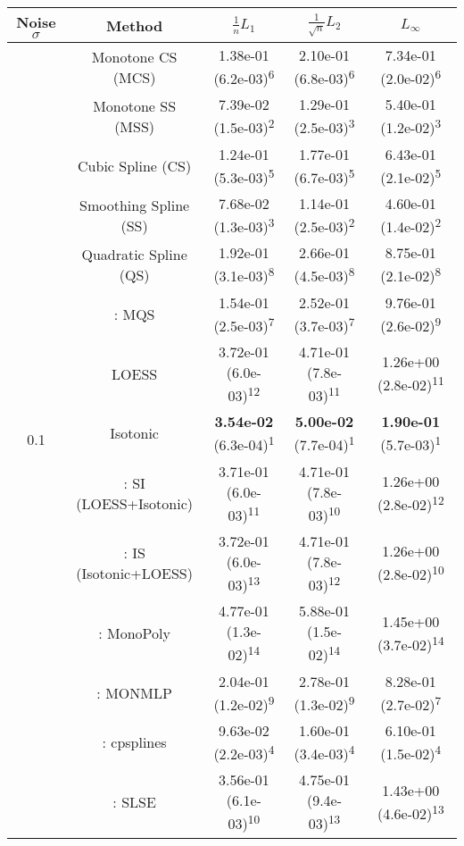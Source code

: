 \begin{tabular}{ccccc}
\toprule
Noise $\sigma$ & Method&$\frac 1n L_1$&$\frac{1}{\sqrt n}L_2$&$L_\infty$\tabularnewline
\midrule
\multirow{14}{*}{0.1}&Monotone CS (MCS)& 1.38e-01 (6.2e-03)\textsuperscript{6}& 2.10e-01 (6.8e-03)\textsuperscript{6}& 7.34e-01 (2.0e-02)\textsuperscript{6}\tabularnewline
&Monotone SS (MSS)& 7.39e-02 (1.5e-03)\textsuperscript{2}& 1.29e-01 (2.5e-03)\textsuperscript{3}& 5.40e-01 (1.2e-02)\textsuperscript{3}\tabularnewline
&Cubic Spline (CS)& 1.24e-01 (5.3e-03)\textsuperscript{5}& 1.77e-01 (6.7e-03)\textsuperscript{5}& 6.43e-01 (2.1e-02)\textsuperscript{5}\tabularnewline
&Smoothing Spline (SS)& 7.68e-02 (1.3e-03)\textsuperscript{3}& 1.14e-01 (2.5e-03)\textsuperscript{2}& 4.60e-01 (1.4e-02)\textsuperscript{2}\tabularnewline
&Quadratic Spline (QS)& 1.92e-01 (3.1e-03)\textsuperscript{8}& 2.66e-01 (4.5e-03)\textsuperscript{8}& 8.75e-01 (2.1e-02)\textsuperscript{8}\tabularnewline
&\textcite{heMonotoneBsplineSmoothing1998}: MQS& 1.54e-01 (2.5e-03)\textsuperscript{7}& 2.52e-01 (3.7e-03)\textsuperscript{7}& 9.76e-01 (2.6e-02)\textsuperscript{9}\tabularnewline
&LOESS& 3.72e-01 (6.0e-03)\textsuperscript{12}& 4.71e-01 (7.8e-03)\textsuperscript{11}& 1.26e+00 (2.8e-02)\textsuperscript{11}\tabularnewline
&Isotonic& \textbf{3.54e-02} (6.3e-04)\textsuperscript{1}& \textbf{5.00e-02} (7.7e-04)\textsuperscript{1}& \textbf{1.90e-01} (5.7e-03)\textsuperscript{1}\tabularnewline
&\textcite{mammenEstimatingSmoothMonotone1991}: SI (LOESS+Isotonic)& 3.71e-01 (6.0e-03)\textsuperscript{11}& 4.71e-01 (7.8e-03)\textsuperscript{10}& 1.26e+00 (2.8e-02)\textsuperscript{12}\tabularnewline
&\textcite{mammenEstimatingSmoothMonotone1991}: IS (Isotonic+LOESS)& 3.72e-01 (6.0e-03)\textsuperscript{13}& 4.71e-01 (7.8e-03)\textsuperscript{12}& 1.26e+00 (2.8e-02)\textsuperscript{10}\tabularnewline
&\textcite{murrayFastFlexibleMethods2016}: MonoPoly& 4.77e-01 (1.3e-02)\textsuperscript{14}& 5.88e-01 (1.5e-02)\textsuperscript{14}& 1.45e+00 (3.7e-02)\textsuperscript{14}\tabularnewline
&\textcite{cannonMonmlpMultilayerPerceptron2017}: MONMLP& 2.04e-01 (1.2e-02)\textsuperscript{9}& 2.78e-01 (1.3e-02)\textsuperscript{9}& 8.28e-01 (2.7e-02)\textsuperscript{7}\tabularnewline
&\textcite{navarro-garciaConstrainedSmoothingOutofrange2023}: cpsplines& 9.63e-02 (2.2e-03)\textsuperscript{4}& 1.60e-01 (3.4e-03)\textsuperscript{4}& 6.10e-01 (1.5e-02)\textsuperscript{4}\tabularnewline
&\textcite{groeneboomConfidenceIntervalsMonotone2023}: SLSE& 3.56e-01 (6.1e-03)\textsuperscript{10}& 4.75e-01 (9.4e-03)\textsuperscript{13}& 1.43e+00 (4.6e-02)\textsuperscript{13}\tabularnewline

\end{tabular}
